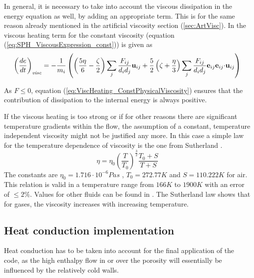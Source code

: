 \documentclass{report}
\begin{document}
In general, it is necessary to take into account the viscous dissipation in the energy equation as well, by adding an appropriate term. This is for the same reason already mentioned in the artificial viscosity section (\ref{sec:ArtVisc}). In \cite{Espanol2003} the viscous heating term for the constant viscosity (equation (\ref{eq:SPH_ViscousExpression_const})) is given as 
\begin{equation}
\label{eq:ViscHeating_ConstPhysicalViscosity}
 \left(\frac{de}{dt}\right)_{\mathit{visc}}=-\frac{1}{m_i}\left(\left(\frac{5\eta}{6}-\frac{\zeta}{2}\right)\sum_j\frac{F_{ij}}{d_i d_j}{\bf u}_{ij}+\frac{5}{2} \left(\zeta+\frac{\eta}{3}\right) \sum_j\frac{F_{ij}}{d_i d_j}{\bf e}_{ij} {\bf e}_{ij}{\bf \cdot u}_{ij}\right)
\end{equation}

As $ F\leq 0$, equation (\ref{eq:ViscHeating_ConstPhysicalViscosity}) ensures that the contribution of dissipation to the internal energy is always positive.

If the viscous heating is too strong or if for other reasons 
there are significant temperature gradients within the flow, the assumption of a constant, temperature independent viscosity might not be justified any more. In this case a simple law for the temperature dependence of viscosity is the one from Sutherland \cite{White1974}.
\begin{equation}
\label{eq:Sutherland_visc}
\eta=\eta_0 \left(\frac{T}{T_0}\right)^{\frac{3}{2}}\frac{T_0+S}{T+S}
\end{equation}
The constants are $\eta_0=1.716\cdot10^{-6}Pa s$
, $T_0=272.77K$ and $S=110.222K$ for air. This relation is valid in a temperature range from $166K$ to $1900K$ with an error of $\leq2\%$.
Values for other fluids can be found in \cite{White1974}. The Sutherland law shows that for gases, the viscosity increases with increasing temperature. %

\subsection{Heat conduction implementation}
\label{sec:HeatCondImplementation}
Heat conduction has to be taken into account for the final application of the code, as the high enthalpy flow in or over the porosity will essentially be influenced by the relatively cold walls. 
\end{document}
